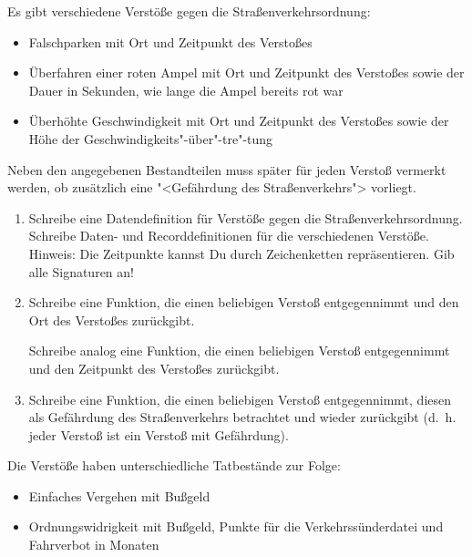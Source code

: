 \begin{aufgabe}

  Es gibt verschiedene Verstöße gegen die
  Straßenverkehrsordnung: 
  \begin{itemize}
  \item Falschparken mit Ort und Zeitpunkt des Verstoßes

  \item Überfahren einer roten Ampel mit Ort und Zeitpunkt des Verstoßes
    sowie der Dauer in Sekunden, wie lange die Ampel bereits rot war

  \item Überhöhte Geschwindigkeit mit Ort und Zeitpunkt des Verstoßes
    sowie der Höhe der Geschwindigkeits"-über"-tre"-tung
  \end{itemize}
  Neben den angegebenen Bestandteilen muss später für jeden Verstoß vermerkt 
  werden, ob zusätzlich eine "<Gefährdung des Straßenverkehrs"> vorliegt.
  
  \begin{enumerate}
  \item Schreibe eine Datendefinition für
    Verstöße gegen die Straßenverkehrsordnung.  Schreibe Daten-
    und Recorddefinitionen für die verschiedenen Verstöße.  Hinweis:
    Die Zeitpunkte kannst Du durch Zeichenketten repräsentieren.  
    Gib alle Signaturen an!

  \item Schreibe eine Funktion, die einen
    beliebigen Verstoß entgegennimmt und den Ort des Verstoßes
    zurückgibt.

    Schreibe analog eine Funktion, die einen
    beliebigen Verstoß entgegennimmt und den Zeitpunkt des Verstoßes
    zurückgibt.

  \item Schreibe eine Funktion, die einen
    beliebigen Verstoß entgegennimmt, diesen als Gefährdung des
    Straßenverkehrs betrachtet und wieder zurückgibt (d.~h. jeder 
    Verstoß ist ein Verstoß mit Gefährdung).
  \end{enumerate}

  Die Verstöße haben unterschiedliche Tatbestände zur Folge:

  \begin{itemize}
  \item Einfaches Vergehen mit Bußgeld

  \item Ordnungswidrigkeit mit Bußgeld, Punkte für die
    Verkehrssünderdatei und Fahrverbot in Monaten


\end{itemize}
\end{aufgabe}
